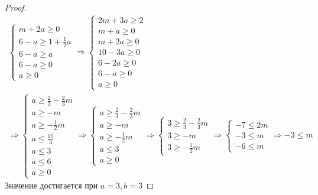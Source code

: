 \begin{proof}
\begin{gather*}
\begin{cases}
            m + 2a \geqslant 0\\
            6 - a \geqslant 1 + \frac{1}{2}a\\
            6 - a \geqslant a\\
            6 - a \geqslant 0\\
            a \geqslant 0
        \end{cases}
        \Rightarrow
        \begin{cases}
            2m + 3a \geqslant 2\\
            m + a \geqslant 0\\
            m + 2a \geqslant 0\\
            10 - 3a \geqslant 0\\
            6 - 2a \geqslant 0\\
            6 - a \geqslant 0\\
            a \geqslant 0
        \end{cases}\\
        \Rightarrow
        \begin{cases}
            a \geqslant \frac{2}{3} - \frac{2}{3}m\\
            a \geqslant -m\\
            a \geqslant -\frac{1}{2}m\\
            a \leqslant \frac{10}{3}\\
            a \leqslant 3\\
            a \leqslant 6\\
            a \geqslant 0
        \end{cases}
        \Rightarrow
        \begin{cases}
            a \geqslant \frac{2}{3} - \frac{2}{3}m\\
            a \geqslant -m\\
            a \geqslant -\frac{1}{2}m\\
            a \leqslant 3\\
            a \geqslant 0
        \end{cases}
        \Rightarrow
        \begin{cases}
            3 \geqslant \frac{2}{3} - \frac{2}{3}m\\
            3 \geqslant -m\\
            3 \geqslant -\frac{1}{2}m
        \end{cases}
        \Rightarrow
        \begin{cases}
            -7 \leqslant 2m\\
            -3 \leqslant m\\
            -6 \leqslant m
        \end{cases}
        \Rightarrow
        -3 \leqslant m
    \end{gather*}
    Значение достигается при $a = 3, b = 3$
\end{proof}